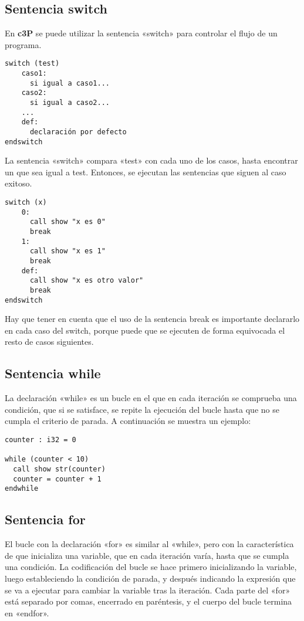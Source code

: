 \subsection{Sentencia switch}

En \textbf{c3P} se puede utilizar la sentencia «switch» para controlar el flujo de un programa.

\begin{verbatim}
switch (test)
    caso1:
      si igual a caso1...
    caso2:
      si igual a caso2...
    ...
    def:
      declaración por defecto
endswitch
\end{verbatim}

La sentencia «switch» compara «test» con cada uno de los casos, hasta encontrar un que sea igual a test. Entonces, se ejecutan las sentencias que siguen al caso exitoso.

\begin{verbatim}
switch (x)
    0:
      call show "x es 0"
      break
    1:
      call show "x es 1"
      break
    def:
      call show "x es otro valor"
      break
endswitch
\end{verbatim}

Hay que tener en cuenta que el uso de la sentencia break es importante
declararlo en cada caso del switch, porque puede que se ejecuten de
forma equivocada el resto de casos siguientes.

\subsection{Sentencia while}
La declaración «while» es un bucle en el que en cada iteración se comprueba una condición,
que si se satisface, se repite la ejecución del bucle hasta que no se cumpla el criterio
de parada. A continuación se muestra un ejemplo:

\begin{verbatim}
counter : i32 = 0

while (counter < 10)
  call show str(counter)
  counter = counter + 1
endwhile
\end{verbatim}

\subsection{Sentencia for}
El bucle con la declaración «for» es similar al «while», pero con la característica de que
inicializa una variable, que en cada iteración varía, hasta que se cumpla una condición.
La codificación del bucle se hace primero inicializando la variable, luego estableciendo
la condición de parada, y después indicando la expresión que se va a ejecutar para cambiar
la variable tras la iteración. Cada parte del «for» está separado por comas, encerrado en
paréntesis, y el cuerpo del bucle termina en «endfor».

